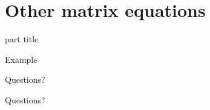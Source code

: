 \documentclass{beamer}
\begin{document}
\section{Other matrix equations}

\begin{frame}
  \begin{beamercolorbox}[sep=12pt,center]{part title}
    \insertsection\par
  \end{beamercolorbox}
\end{frame}

\begin{frame}{Example}
  
\end{frame}

\begin{frame}
  Questions?
\end{frame}

\begin{frame}
  Questions?
\end{frame}
\end{document}
